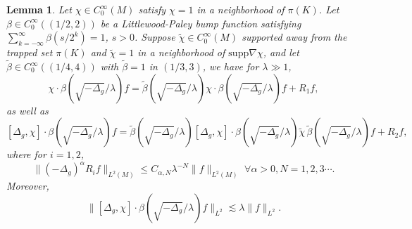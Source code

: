 \documentclass[10pt,a4paper]{amsart}
\newtheorem{lemma}{Lemma}
\newcommand{\la}{\lambda}
\newcommand{\supp}{\mathrm{supp }}
\begin{document}
\begin{lemma}\label{co}
    Let $\chi\in C_0^\infty(M)$ satisfy $\chi=1$ in a neighborhood of $\pi(K)$. Let $\beta\in C_0^{\infty}((1/2,2))$ be a Littlewood-Paley bump function satisfying $\sum_{k=-\infty}^\infty \beta(s/2^k)=1$,
$s>0$. Suppose $\tilde \chi\in C_0^\infty(M)$ supported away from the trapped set $\pi(K)$ and $\tilde\chi=1$ in a neighborhood of $\supp \nabla\chi$,  and let $\tilde \beta \in C^\infty_0((1/4,4))$ with $\tilde \beta=1$ in $(1/3,3)$, we have for $\la\gg 1$,
\begin{equation}\label{commuteerror}
    \chi \cdot \beta(\sqrt{-\Delta_g}/\la)f = \tilde\beta(\sqrt{-\Delta_g}/\la) \chi \cdot \beta(\sqrt{-\Delta_g}/\la)  f
+R_1f,
\end{equation}
as well as  
\begin{equation}\label{commuteerror1}
    [\Delta_g,\chi] \cdot \beta(\sqrt{-\Delta_g}/\la)f= \tilde\beta(\sqrt{-\Delta_g}/\la)  [\Delta_g,\chi] \cdot \beta(\sqrt{-\Delta_g}/\la)\tilde\chi \,\tilde\beta(\sqrt{-\Delta_g}/\la)  f
+R_2f,
\end{equation}
where for $i=1,2$,
\begin{equation}\label{r}
    \|(-\Delta_g)^{\alpha}R_if\|_{L^2(M)}\le C_{\alpha,N}\la^{-N}\|f\|_{L^2(M)}  \,\,\forall \alpha>0, N=1,2,3\cdots.
\end{equation}
Moreover,
\begin{equation}\label{commuteerror2}
\| [\Delta_g,\chi] \cdot \beta(\sqrt{-\Delta_g}/\la)f\|_{L^2}\lesssim \la\|f\|_{L^2}.
\end{equation}
\end{lemma}
\end{document}
